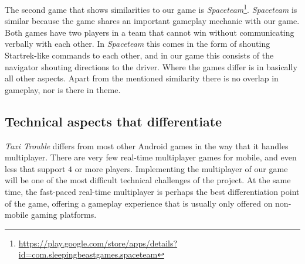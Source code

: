 \documentclass[11pt,twoside,a4paper]{article}
\begin{document}
The second game that shows similarities to our game is \emph{Spaceteam}\footnote{\url{https://play.google.com/store/apps/details?id=com.sleepingbeastgames.spaceteam}}. \emph{Spaceteam} is similar because the game shares an important gameplay mechanic with our game. Both games have two players in a team that cannot win without communicating verbally with each other. In \emph{Spaceteam} this comes in the form of shouting Startrek-like commands to each other, and in our game this consists of the navigator shouting directions to the driver. Where the games differ is in basically all other aspects. Apart from the mentioned similarity there is no overlap in gameplay, nor is there in theme.

\subsection*{Technical aspects that differentiate}
\emph{Taxi Trouble} differs from most other Android games in the way that it handles multiplayer. There are very few real-time multiplayer games for mobile, and even less that support $4$ or more players. Implementing the multiplayer of our game will be one of the most difficult technical challenges of the project. At the same time, the fast-paced real-time multiplayer is perhaps the best differentiation point of the game, offering a gameplay experience that is usually only offered on non-mobile gaming platforms.
\end{document}
